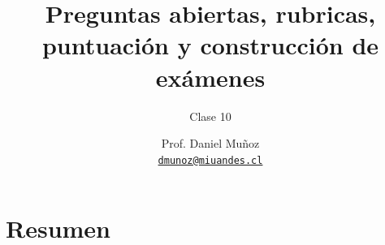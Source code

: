 \documentclass[11pt, aspectratio=169, xcolor=table,hyphens]{beamer}
\begin{document}
\author{Prof. Daniel Muñoz \\
	\href{mailto:dmunoz@miuandes.cl}{\texttt{dmunoz@miuandes.cl}}}
\title{Preguntas abiertas, rubricas, puntuación y construcción de exámenes}
\subtitle{Clase 10}
\date{}
\maketitle



\section{Resumen}
\end{document}
